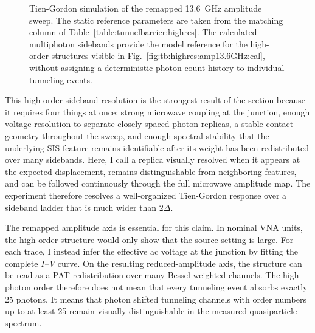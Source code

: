         \begin{figure}[p]
            \centering

            \caption{
                Remapped amplitude sweep of TB1 at \qty{13.6}{\giga\hertz}. The vertical axis is the fitted reduced drive amplitude from Fig.~\ref{fig:tb:highres:amp13.6GHz:fit} rather than the nominal VNA output. The microwave coupling is stronger than at \qty{18.3}{\giga\hertz}, and the lower photon energy increases the reduced drive amplitude for the same ac voltage. The false-color map resolves individual photon assisted replicas to at least order 25. The parameters are listed in Table~\ref{table:tunnelbarrier:highres}.
            }
            \label{fig:tb:highres:amp13.6GHz:cal}

            \vspace{1em}

            \caption{
                Tien-Gordon simulation of the remapped \qty{13.6}{\giga\hertz} amplitude sweep. The static reference parameters are taken from the matching column of Table~\ref{table:tunnelbarrier:highres}. The calculated multiphoton sidebands provide the model reference for the high-order structures visible in Fig.~\ref{fig:tb:highres:amp13.6GHz:cal}, without assigning a deterministic photon count history to individual tunneling events.
            }
            \label{fig:tb:highres:amp13.6GHz:sim}
        \end{figure}

        This high-order sideband resolution is the strongest result of the section because it requires four things at once: strong microwave coupling at the junction, enough voltage resolution to separate closely spaced photon replicas, a stable contact geometry throughout the sweep, and enough spectral stability that the underlying SIS feature remains identifiable after its weight has been redistributed over many sidebands. Here, I call a replica visually resolved when it appears at the expected displacement, remains distinguishable from neighboring features, and can be followed continuously through the full microwave amplitude map. The experiment therefore resolves a well-organized Tien-Gordon response over a sideband ladder that is much wider than $2\Delta$.

        The remapped amplitude axis is essential for this claim. In nominal VNA units, the high-order structure would only show that the source setting is large. For each trace, I instead infer the effective ac voltage at the junction by fitting the complete \textit{I--V} curve. On the resulting reduced-amplitude axis, the structure can be read as a PAT redistribution over many Bessel weighted channels. The high photon order therefore does not mean that every tunneling event absorbs exactly 25 photons. It means that photon shifted tunneling channels with order numbers up to at least 25 remain visually distinguishable in the measured quasiparticle spectrum.

